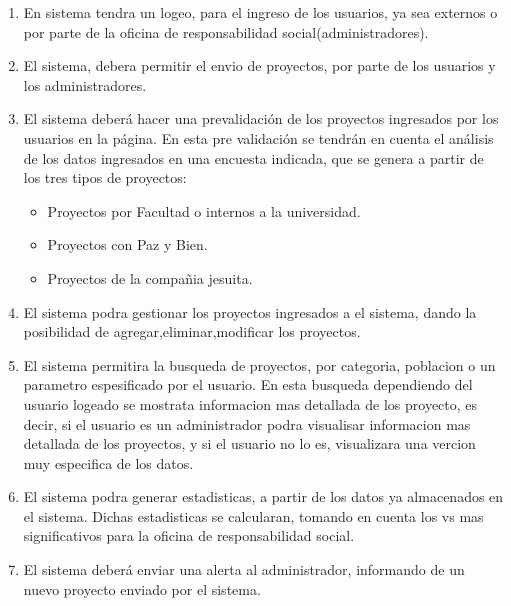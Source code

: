 \documentclass[12pt]{article}
\begin{document}
\begin{enumerate}
\item
En sistema tendra un logeo, para el ingreso de los usuarios, ya sea externos o por parte de la oficina de responsabilidad social(administradores).\\
\item
El sistema, debera permitir el envio de proyectos, por parte de los usuarios y los administradores.\\
\item
El sistema deberá hacer una prevalidaci\'on de los proyectos ingresados
por los usuarios en la p\'agina. En esta pre validaci\'on se tendr\'an en
cuenta el an\'alisis de los datos ingresados en una encuesta indicada, que se genera a partir de los tres tipos de proyectos:
\begin{itemize}
\item
Proyectos por Facultad o internos a la universidad.
\item
Proyectos con Paz y Bien.
\item
Proyectos de la compa\~nia jesuita.\\
\end{itemize}
\item
El sistema podra gestionar los proyectos ingresados a el sistema, dando la posibilidad de agregar,eliminar,modificar los proyectos.\\
\item
El sistema permitira la busqueda de proyectos, por categoria, poblacion o un parametro espesificado por el usuario. En esta busqueda dependiendo del usuario logeado se mostrata informacion mas detallada de los proyecto, es decir, si el usuario es un administrador podra visualisar informacion mas detallada de los proyectos, y si el usuario no lo es, visualizara una vercion muy especifica de los datos.\\
\item
El sistema podra generar estadisticas, a partir de los datos ya almacenados en el sistema. Dichas estadisticas se calcularan, tomando en cuenta los vs mas significativos para la oficina de responsabilidad social.\\ 
\item
El sistema deberá enviar una alerta al administrador, informando de
un nuevo proyecto enviado por el sistema.
\end{enumerate}
\end{document}
